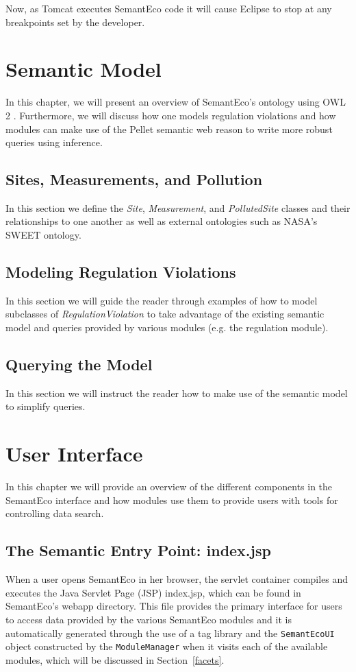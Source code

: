 \documentclass[letterpaper]{report}
\begin{document}
Now, as Tomcat executes SemantEco code it will cause Eclipse to stop at any breakpoints set by the developer.

\chapter{Semantic Model}
\label{semantic-model}
In this chapter, we will present an overview of SemantEco's ontology using OWL 2 \cite{OWL2}. Furthermore, we will discuss how one models regulation violations and how modules can make use of the Pellet \cite{Pellet} semantic web reason to write more robust queries using inference.
\section{Sites, Measurements, and Pollution}
\label{class-defs}
In this section we define the \textit{Site}, \textit{Measurement}, and \textit{PollutedSite} classes and their relationships to one another as well as external ontologies such as NASA's SWEET ontology.
\section{Modeling Regulation Violations}
\label{regulation-violation}
In this section we will guide the reader through examples of how to model subclasses of \textit{RegulationViolation} to take advantage of the existing semantic model and queries provided by various modules (e.g. the regulation module).
\section{Querying the Model}
\label{querying}
In this section we will instruct the reader how to make use of the semantic model to simplify queries.


\chapter{User Interface}
\label{user-interface}
In this chapter we will provide an overview of the different components in the SemantEco interface and how modules use them to provide users with tools for controlling data search.

\section{The Semantic Entry Point: index.jsp}
\label{index.jsp}
When a user opens SemantEco in her browser, the servlet container compiles and executes the Java Servlet Page (JSP) index.jsp, which can be found in SemantEco's webapp directory. This file provides the primary interface for users to access data provided by the various SemantEco modules and it is automatically generated through the use of a tag library and the \texttt{SemantEcoUI} object constructed by the \texttt{ModuleManager} when it visits each of the available modules, which will be discussed in Section~\ref{facets}.
\end{document}

